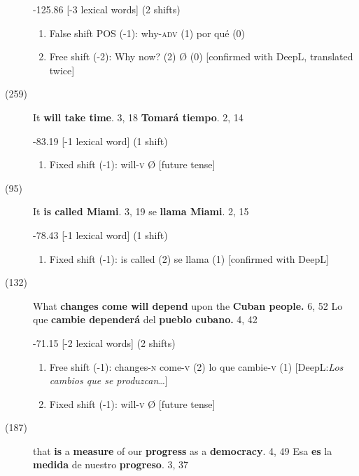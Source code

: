 \documentclass[output=paper]{langsci/langscibook}
\begin{document}
\begin{description}
    -125.86 [-3 lexical words] (2 shifts)

    \begin{enumerate}
      \item False shift POS (-1): why-\textsc{adv} (1) \rightarrow por qué (0)
      \item Free shift (-2): Why now? (2) \rightarrow Ø (0) [confirmed with DeepL, translated twice]
    \end{enumerate}

  \item[(259)] It \textbf{will take time}. 3, 18 \rightarrow \textbf{Tomará tiempo}. 2, 14 

    -83.19 [-1 lexical word] (1 shift)

    \begin{enumerate}
      \item Fixed shift (-1): will-\textsc{v} \rightarrow Ø [future tense]
    \end{enumerate}

  \item[(95)] It \textbf{is called Miami}. 3, 19 \rightarrow se \textbf{llama Miami}. 2, 15

    -78.43 [-1 lexical word] (1 shift)

    \begin{enumerate}
      \item Fixed shift (-1): is called (2) \rightarrow se llama (1) [confirmed with DeepL]
    \end{enumerate}

  \item[(132)] What \textbf{changes come will depend} upon the \textbf{Cuban people.} 6, 52 \rightarrow Lo que \textbf{cambie dependerá} del \textbf{pueblo cubano.} 4, 42

    -71.15 [-2 lexical words] (2 shifts)

    \begin{enumerate}
      \item Free shift (-1): changes-\textsc{n} come-\textsc{v} (2) \rightarrow lo que cambie-\textsc{v} (1) [DeepL:\textit{Los cambios que se produzcan\dots}]
      \item Fixed shift (-1): will-\textsc{v} \rightarrow Ø [future tense]
    \end{enumerate}

  \item[(187)] that \textbf{is} a \textbf{measure} of our \textbf{progress} as a \textbf{democracy}. 4, 49 \rightarrow Esa \textbf{es} la \textbf{medida} de nuestro \textbf{progreso}. 3, 37


\end{description}
\end{document}
